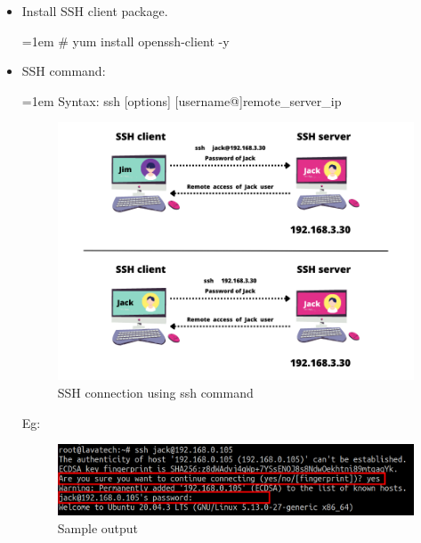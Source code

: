 \setlength{\columnsep}{3pt}
\begin{flushleft}

\bigskip
\begin{itemize}
	\item Install SSH client package.
	\bigskip
	\begin{tcolorbox}[breakable,notitle,boxrule=-0pt,colback=black,colframe=black]
		\color{green}
		\font=1em
		\# yum install openssh-client -y
		\font=4pt
	\end{tcolorbox}
	\bigskip
	
	\item SSH command:
	\bigskip
	\begin{tcolorbox}[breakable,notitle,boxrule=0pt,colback=pink,colframe=pink]
		\color{black}
		\font=1em
		Syntax: ssh [options] [username@]remote\_server\_ip
		\font=4pt
	\end{tcolorbox}
	
	\begin{figure}[h!]
		\centering
		\includegraphics[scale=0.6]{content/chapter19/images/ssh4.png}
		\caption{SSH connection using ssh command}
		\label{fig:stage5}
	\end{figure}
	
	
	Eg:
	\begin{figure}[h!]
		\centering
		\includegraphics[scale=0.3]{content/chapter19/images/ssh6.png}
		\caption{Sample output}
		\label{fig:stage55}
	\end{figure}
		

\end{itemize}
\end{flushleft}
